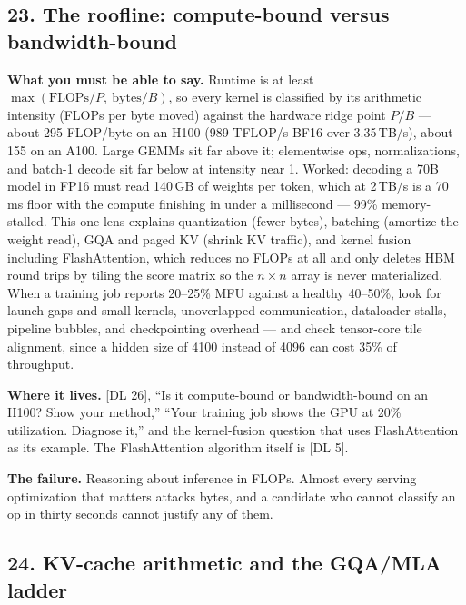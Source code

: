 \subsection*{23. The roofline: compute-bound versus bandwidth-bound}

\textbf{What you must be able to say.} Runtime is at least $\max(\mathrm{FLOPs}/P,\ \mathrm{bytes}/B)$, so every kernel is classified by its arithmetic intensity (FLOPs per byte moved) against the hardware ridge point $P/B$ --- about 295 FLOP/byte on an H100 (989 TFLOP/s BF16 over 3.35\,TB/s), about 155 on an A100. Large GEMMs sit far above it; elementwise ops, normalizations, and batch-1 decode sit far below at intensity near 1. Worked: decoding a 70B model in FP16 must read 140\,GB of weights per token, which at 2\,TB/s is a 70\,ms floor with the compute finishing in under a millisecond --- 99\% memory-stalled. This one lens explains quantization (fewer bytes), batching (amortize the weight read), GQA and paged KV (shrink KV traffic), and kernel fusion including FlashAttention, which reduces no FLOPs at all and only deletes HBM round trips by tiling the score matrix so the $n \times n$ array is never materialized. When a training job reports 20--25\% MFU against a healthy 40--50\%, look for launch gaps and small kernels, unoverlapped communication, dataloader stalls, pipeline bubbles, and checkpointing overhead --- and check tensor-core tile alignment, since a hidden size of 4100 instead of 4096 can cost 35\% of throughput.

\textbf{Where it lives.} [DL 26], ``Is it compute-bound or bandwidth-bound on an H100? Show your method,'' ``Your training job shows the GPU at 20\% utilization. Diagnose it,'' and the kernel-fusion question that uses FlashAttention as its example. The FlashAttention algorithm itself is [DL 5].

\textbf{The failure.} Reasoning about inference in FLOPs. Almost every serving optimization that matters attacks bytes, and a candidate who cannot classify an op in thirty seconds cannot justify any of them.

\subsection*{24. KV-cache arithmetic and the GQA/MLA ladder}

